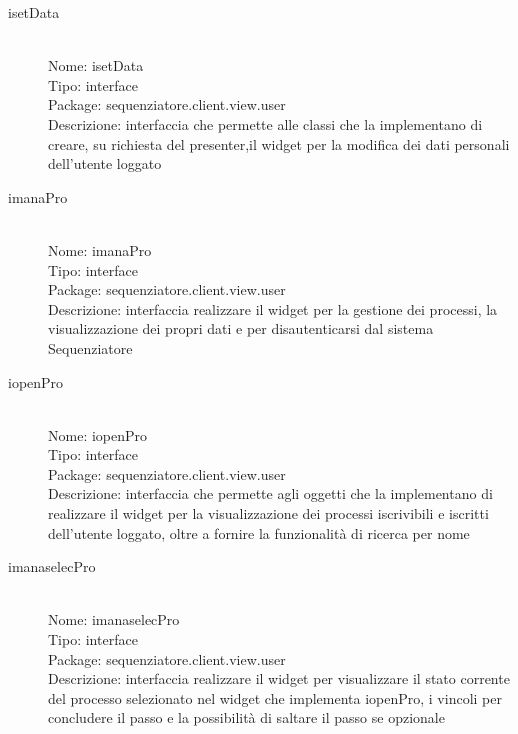 \begin{description}
	\item[isetData] 
  	\hfill \\
  	Nome: isetData\\
  	Tipo: interface\\
	Package: sequenziatore.client.view.user\\
	Descrizione: interfaccia che permette alle classi che la implementano di creare, su richiesta del presenter,il widget per la modifica dei dati personali dell'utente loggato
\end{description}

\begin{description}
	\item[imanaPro] 
  	\hfill \\
  	Nome: imanaPro\\
  	Tipo: interface\\
	Package: sequenziatore.client.view.user\\
	Descrizione: interfaccia realizzare il widget per la gestione dei processi, la visualizzazione dei propri dati e per disautenticarsi dal sistema Sequenziatore
\end{description}

\begin{description}
	\item[iopenPro] 
  	\hfill \\
  	Nome: iopenPro\\
  	Tipo: interface\\
	Package: sequenziatore.client.view.user\\
	Descrizione: interfaccia che permette agli oggetti che la implementano di realizzare il widget per la visualizzazione dei processi iscrivibili e iscritti dell'utente loggato, oltre a fornire la funzionalità di ricerca per nome
\end{description}

\begin{description}
	\item[imanaselecPro] 
  	\hfill \\
  	Nome: imanaselecPro\\
  	Tipo: interface\\
	Package: sequenziatore.client.view.user\\
	Descrizione: interfaccia realizzare il widget per visualizzare il stato corrente del processo selezionato nel widget che implementa iopenPro, i vincoli per concludere il passo e la possibilità di saltare il passo se opzionale
\end{description}

